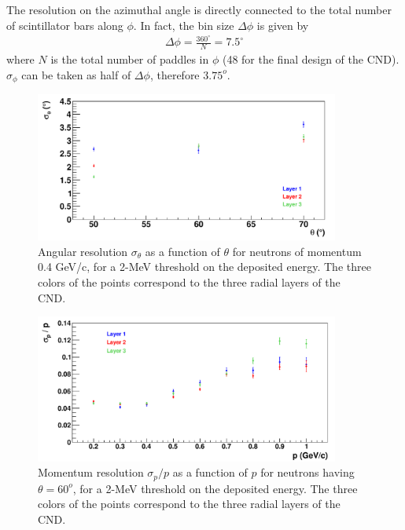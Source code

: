 The resolution on the azimuthal angle is directly connected to the total number of scintillator bars along $\phi$. In fact, the bin size $\Delta\phi$ is given by
\begin{eqnarray} 
\Delta\phi = \frac{360^{\circ}}{N}=7.5^{\circ}
\end{eqnarray}
where $N$ is the total number of paddles in $\phi$ (48 for the final design of the CND). $\sigma_\phi$ can be taken as half of $\Delta\phi$, therefore $3.75^o$.
\begin{figure}[hbt]  
\begin{center}
\includegraphics[width=100mm]{sigma_theta_vs_theta_diff_layer.pdf}
\caption [Angular resolution of the CND as a function of $\theta$]
{Angular resolution $\sigma_\theta$ as a function of $\theta$ for neutrons of momentum 0.4 GeV/c, for a 2-MeV threshold on the deposited energy. The three colors of the points correspond to the three radial layers of the CND.}
\label{theta_n_tofcut5}
\end{center}
\end{figure}

\begin{figure}  
\begin{center}
\includegraphics[width=100mm]{mom_res_vs_mom_diff_layers.pdf}
\caption [Momentum resolution as a function of $p$]
{Momentum resolution $\sigma_p/p$ as a function of $p$ for neutrons having $\theta=60^o$, for a 2-MeV threshold on the deposited energy. The three colors of the points correspond to the three radial layers of the CND.}
\label{p_n_tofcut5}
\end{center}
\end{figure}

